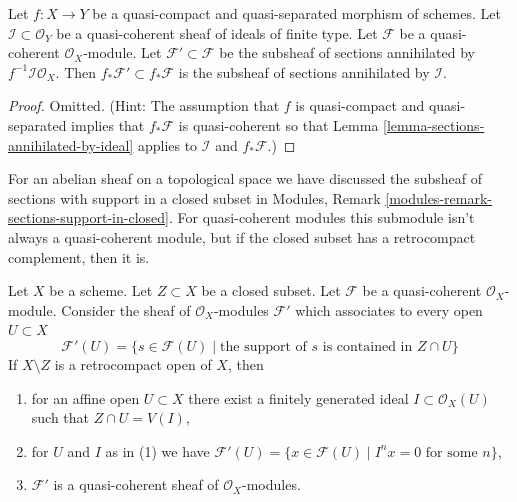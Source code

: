 \begin{lemma}
\label{lemma-push-sections-annihilated-by-ideal}
Let $f : X \to Y$ be a quasi-compact and quasi-separated morphism
of schemes. Let $\mathcal{I} \subset \mathcal{O}_Y$ be a quasi-coherent
sheaf of ideals of finite type. Let $\mathcal{F}$ be a quasi-coherent
$\mathcal{O}_X$-module. Let $\mathcal{F}' \subset \mathcal{F}$
be the subsheaf of sections annihilated by $f^{-1}\mathcal{I}\mathcal{O}_X$.
Then $f_*\mathcal{F}' \subset f_*\mathcal{F}$ is the subsheaf
of sections annihilated by $\mathcal{I}$.
\end{lemma}

\begin{proof}
Omitted. (Hint: The assumption that $f$ is quasi-compact and
quasi-separated implies that $f_*\mathcal{F}$ is quasi-coherent
so that Lemma \ref{lemma-sections-annihilated-by-ideal} applies
to $\mathcal{I}$ and $f_*\mathcal{F}$.)
\end{proof}

\noindent
For an abelian sheaf on a topological space we have discussed the subsheaf
of sections with support in a closed subset in
Modules, Remark \ref{modules-remark-sections-support-in-closed}.
For quasi-coherent modules this submodule isn't always a quasi-coherent
module, but if the closed subset has a retrocompact complement, then
it is.

\begin{lemma}
\label{lemma-sections-supported-on-closed-subset}
Let $X$ be a scheme. Let $Z \subset X$ be a closed subset.
Let $\mathcal{F}$ be a quasi-coherent $\mathcal{O}_X$-module.
Consider the sheaf of $\mathcal{O}_X$-modules $\mathcal{F}'$
which associates to every open $U \subset X$
$$
\mathcal{F}'(U)
=
\{s \in \mathcal{F}(U) \mid
\text{the support of }s\text{ is contained in }Z \cap U\}
$$
If $X \setminus Z$ is a retrocompact open of $X$, then
\begin{enumerate}
\item for an affine open $U \subset X$ there exist a finitely generated
ideal $I \subset \mathcal{O}_X(U)$ such that $Z \cap U = V(I)$,
\item for $U$ and $I$ as in (1) we have
$\mathcal{F}'(U) = \{x \in \mathcal{F}(U) \mid
I^nx = 0 \text{ for some } n\}$,
\item $\mathcal{F}'$ is a quasi-coherent sheaf of $\mathcal{O}_X$-modules.
\end{enumerate}
\end{lemma}

